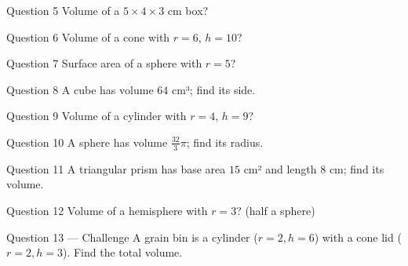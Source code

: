 \documentclass[11pt]{article}
\begin{document}
\begin{qbox}{Question 5}
Volume of a $5\times4\times3$ cm box?\workspace{2.4cm}
\end{qbox}

\begin{qbox}{Question 6}
Volume of a cone with $r=6$, $h=10$?\workspace{2.4cm}
\end{qbox}

\begin{qbox}{Question 7}
Surface area of a sphere with $r=5$?\workspace{2.4cm}
\end{qbox}

\begin{qbox}{Question 8}
A cube has volume $64$ cm³; find its side.\workspace{2.4cm}
\end{qbox}

\begin{qbox}{Question 9}
Volume of a cylinder with $r=4$, $h=9$?\workspace{2.4cm}
\end{qbox}

\begin{qbox}{Question 10}
A sphere has volume $\tfrac{32}{3}\pi$; find its radius.\workspace{2.4cm}
\end{qbox}

\begin{qbox}{Question 11}
A triangular prism has base area $15$ cm² and length $8$ cm; find its volume.\workspace{2.4cm}
\end{qbox}

\begin{qbox}{Question 12}
Volume of a hemisphere with $r=3$? (half a sphere)\workspace{2.4cm}
\end{qbox}

\begin{qbox}{Question 13 --- Challenge}
A grain bin is a cylinder ($r=2,h=6$) with a cone lid ($r=2,h=3$). Find the total volume.\workspace{3.5cm}
\end{qbox}

\clearpage
{}
\end{document}
